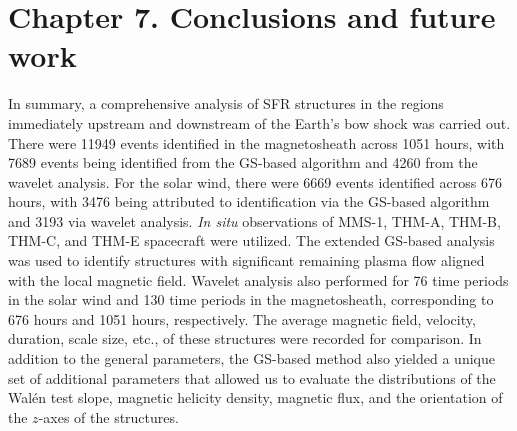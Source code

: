 \chapter{Chapter 7. Conclusions and future work}

In summary, a comprehensive analysis of SFR structures in the regions immediately upstream and downstream of the Earth's bow shock was carried out. There were 11949 events identified in the magnetosheath across 1051 hours, with 7689 events being identified from the GS-based algorithm and 4260 from the wavelet analysis. For the solar wind, there were 6669 events identified across 676 hours, with 3476 being attributed to identification via the GS-based algorithm and 3193 via wavelet analysis. \textit{In situ} observations of MMS-1, THM-A, THM-B, THM-C, and THM-E spacecraft were utilized. The extended GS-based analysis was used to identify structures with significant remaining plasma flow aligned with the local magnetic field. Wavelet analysis also performed for 76 time periods in the solar wind and 130 time periods in the magnetosheath, corresponding to 676 hours and 1051 hours, respectively. The average magnetic field, velocity, duration, scale size, etc., of these structures were recorded for comparison. In addition to the general parameters, the GS-based method also yielded a unique set of additional parameters that allowed us to evaluate the distributions of the Wal\'en test slope, magnetic helicity density, magnetic flux, and the orientation of the $z$-axes of the structures.

